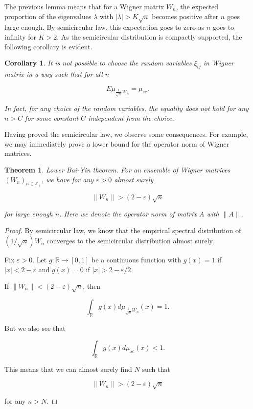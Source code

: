 \documentclass[12pt,a4paper,leqno]{report}
\newcommand{\R}{\mathbb{R}}
\newcommand{\Z}{\mathbb{Z}}
\newcommand{\eps}{\varepsilon}
\theoremstyle{plain}
\newtheorem{theo}[equation]{Theorem}
\newtheorem{cor}[equation]{Corollary}
\theoremstyle{definition}
\theoremstyle{remark}
\begin{document}
The previous lemma means that for a Wigner matrix $W_n$, the expected proportion of the eigenvalues $\lambda$ with $|\lambda| > K\sqrt{n}$ becomes positive after $n$ goes large enough. By semicircular law, this expectation goes to zero as $n$ goes to infinity for $K > 2$. As the semicircular distribution is compactly supported, the following corollary is evident.

\begin{cor}
It is not possible to choose the random variables $\xi_{ij}$ in Wigner matrix in a way such that for all $n$

\begin{equation*}
E\mu_{\frac{1}{\sqrt{n}}W_n} = \mu_{sc}. 
\end{equation*}

In fact, for any choice of the random variables, the equality does not hold for any $n>C$ for some constant $C$ independent from the choice.

\end{cor}



Having proved the semicircular law, we observe some consequences. For example, we may immediately prove a lower bound for the operator norm of Wigner matrices. 

\begin{theo}
\emph{Lower Bai-Yin theorem}. For an ensemble of Wigner matrices $(W_n)_{n \in \Z_+}$, we have for any $\eps > 0$ almost surely

\begin{equation*}
\|W_n\| > (2-\eps) \sqrt{n}
\end{equation*}

for large enough $n$. Here we denote the operator norm of matrix $A$ with $\| A \|$.
\end{theo}

\begin{proof}
By semicircular law, we know that the empirical spectral distribution of $(1/\sqrt{n}) W_n$ converges to the semicircular distribution almost surely.

Fix $\eps>0$. Let $g : \R \to [0,1]$ be a continuous function with
$g(x)= 1$ if $|x|<2-\eps$ and $g(x) = 0$ if $|x|>2-\eps/2$.

If $\|W_n\| < (2-\eps)\sqrt{n}$, then 

\begin{equation*}
\int_{\R} g(x) d\mu_{\frac{1}{\sqrt{n}}W_n}(x) = 1.
\end{equation*}

But we also see that

\begin{equation*}
\int_{\R} g(x) d\mu_{sc}(x) < 1.
\end{equation*}

This means that we can almost surely find $N$ such that

\begin{equation*}
\| W_n \| > (2-\eps) \sqrt{n}
\end{equation*}

for any $n>N$.
\end{proof}
\end{document}
